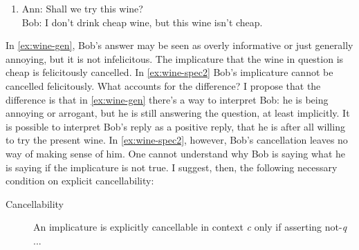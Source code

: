 \documentclass[12pt]{article}
\begin{document}
\begin{enumerate}[resume]
  \item\label{ex:wine-gen}
    Ann: Shall we try this wine?\\
    Bob: I don't drink cheap wine, but this wine isn't cheap.
\end{enumerate}
%
In \ref{ex:wine-gen}, Bob's answer may be seen as overly informative or just generally annoying, but it is not infelicitous. The implicature that the wine in question is cheap is felicitously cancelled. In \ref{ex:wine-spec2} Bob's implicature cannot be cancelled felicitously. What accounts for the difference? I propose that the difference is that in \ref{ex:wine-gen} there's a way to interpret Bob: he is being annoying or arrogant, but he is still answering the question, at least implicitly. It is possible to interpret Bob's reply as a positive reply, that he is after all willing to try the present wine. In \ref{ex:wine-spec2}, however, Bob's cancellation leaves no way of making sense of him. One cannot understand why Bob is saying what he is saying if the implicature is not true. I suggest, then, the following necessary condition on explicit cancellability:

\begin{description}
    \item[Cancellability] An implicature is explicitly cancellable in context \textit{c} only if asserting not-\textit{q} ...
\end{description}

\printbibliography
\end{document}
